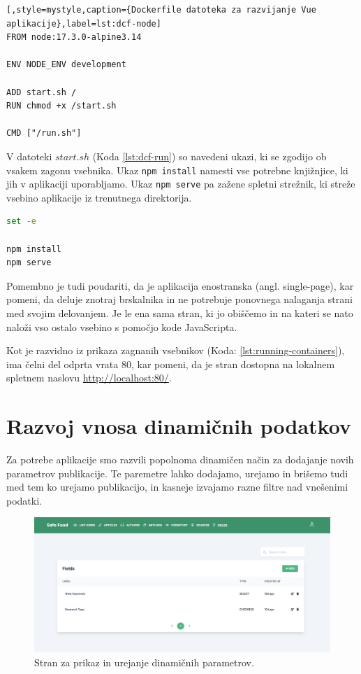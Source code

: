 \documentclass[a4paper, 12pt]{book}
\begin{document}
\begin{lstlisting}[,style=mystyle,caption={Dockerfile datoteka za razvijanje Vue aplikacije},label=lst:dcf-node]
FROM node:17.3.0-alpine3.14

ENV NODE_ENV development

ADD start.sh /
RUN chmod +x /start.sh

CMD ["/run.sh"]
\end{lstlisting}

V datoteki $start.sh$ (Koda \ref{lst:dcf-run}) so navedeni ukazi, ki se zgodijo ob vsakem zagonu vsebnika. Ukaz \texttt{npm install} namesti vse potrebne knjižnjice, ki jih v aplikaciji uporabljamo. Ukaz \texttt{npm serve} pa zažene spletni strežnik, ki streže vsebino aplikacije iz trenutnega direktorija.

\begin{lstlisting}[language=bash,style=mystyle,caption={Ukazna datoteka, ki naloži potrebne knjižnice in streže aplikacijo},label=lst:dcf-run]
set -e

npm install
npm serve
\end{lstlisting}

Pomembno je tudi poudariti, da je aplikacija enostranska (angl. single-page), kar pomeni, da deluje znotraj brskalnika in ne potrebuje ponovnega nalaganja strani med svojim delovanjem. Je le ena sama stran, ki jo obiščemo in na kateri se nato naloži vso ostalo vsebino s pomočjo kode JavaScripta.

Kot je razvidno iz prikaza zagnanih vsebnikov (Koda: \ref{lst:running-containers}), ima čelni del odprta vrata 80, kar pomeni, da je stran dostopna na lokalnem spletnem naslovu \url{http://localhost:80/}. 

\section{Razvoj vnosa dinamičnih podatkov}
Za potrebe aplikacije smo razvili popolnoma dinamičen način za dodajanje novih parametrov publikacije. Te paremetre lahko dodajamo, urejamo in brišemo tudi med tem ko urejamo publikacijo, in kasneje izvajamo razne filtre nad vnešenimi podatki.

\begin{figure}[h]
\begin{center}
\includegraphics[width=1\textwidth]{slike/fields-list.png}
\end{center}
\caption{ Stran za prikaz in urejanje dinamičnih parametrov. }
\label{fields-list}
\end{figure}
\end{document}
